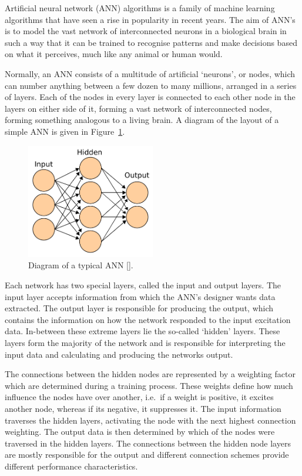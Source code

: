 Artificial neural network (ANN) algorithms is a family of machine learning algorithms that have seen a rise in popularity in recent years. The aim of ANN's is to model the vast network of interconnected neurons in a biological brain in such a way that it can be trained to recognise patterns and make decisions based on what it perceives, much like any animal or human would. 

Normally, an ANN consists of a multitude of artificial `neurons', or nodes, which can number anything between a few dozen to many millions, arranged in a series of layers. Each of the nodes in every layer is connected to each other node in the layers on either side of it, forming a vast network of interconnected nodes, forming something analogous to a living brain. A diagram of the layout of a simple ANN is given in Figure~\ref{fig:chap2-ann-layout}.

\begin{figure}
  \centering
  \includegraphics[width=0.5\textwidth]{figures/chapter2/ANN_diagram}
  \caption[Diagram of a typical ANN.]{Diagram of a typical ANN [\cite{ann-wiki-pic}].}
\label{fig:chap2-ann-layout}
\end{figure}

Each network has two special layers, called the input and output layers. The input layer accepts information from which the ANN's designer wants data extracted. The output layer is responsible for producing the output, which contains the information on how the network responded to the input excitation data. In-between these extreme layers lie the so-called `hidden' layers. These layers form the majority of the network and is responsible for interpreting the input data and calculating and producing the networks output. 

The connections between the hidden nodes are represented by a weighting factor which are determined during a training process. These weights define how much influence the nodes have over another, i.e.\ if a weight is positive, it excites another node, whereas if its negative, it suppresses it. The input information traverses the hidden layers, activating the node with the next highest connection weighting. The output data is then determined by which of the nodes were traversed in the hidden layers. The connections between the hidden node layers are mostly responsible for the output and different connection schemes provide different performance characteristics. 

